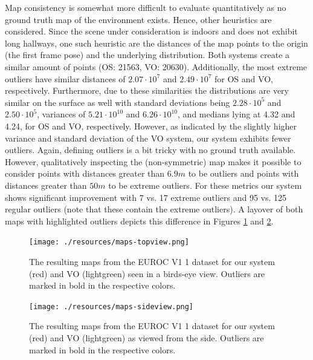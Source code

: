\documentclass[a4paper, 10pt]{article}
\begin{document}
Map consistency is somewhat more difficult to evaluate quantitatively as no ground truth map of the environment exists. 
Hence, other heuristics are considered. Since the scene under consideration is indoors and does not exhibit long hallways, one such heuristic are the distances of the map points 
to the origin (the first frame pose) and the underlying distribution. Both systems create a similar amount of points (OS: 21563, VO: 20630). 
Additionally, the most extreme outliers have similar distances of \(2.07 \cdot 10^7\) and \(2.49 \cdot 10^7\) for OS and VO, respectively. Furthermore, due to these similarities the distributions are very similar on the
surface as well with standard deviations being \(2.28 \cdot 10^5\) and \(2.50 \cdot 10^5\), variances of \(5.21 \cdot 10^{10}\) and \(6.26 \cdot 10^{10}\), and medians lying at 4.32 and 4.24, for OS and VO, respectively.
However, as indicated by the slightly higher variance and standard deviation of the VO system, our system exhibits fewer outliers. Again, defining outliers is a bit tricky with no ground truth available. However,
qualitatively inspecting the (non-symmetric) map makes it possible to consider points with distances greater than \(6.9m\) to be outliers and points with distances greater than \(50m\) to be extreme outliers. For these metrics
our system shows significant improvement with 7 vs. 17 extreme outliers and 95 vs. 125 regular outliers (note that these contain the extreme outliers).
A layover of both maps with highlighted outliers depicts this difference in Figures \ref{fig:orge9540f2} and \ref{fig:org0008070}.
\begin{figure}[htbp]
\centering
\texttt{[image: ./resources/maps-topview.png]}
\caption{\label{fig:orge9540f2}
The resulting maps from the EUROC V1 1 dataset for our system (red) and VO (lightgreen) seen in a birds-eye view. Outliers are marked in bold in the respective colors.}
\end{figure}

\begin{figure}[htbp]
\centering
\texttt{[image: ./resources/maps-sideview.png]}
\caption{\label{fig:org0008070}
The resulting maps from the EUROC V1 1 dataset for our system (red) and VO (lightgreen) as viewed from the side. Outliers are marked in bold in the respective colors.}
\end{figure}
\end{document}
